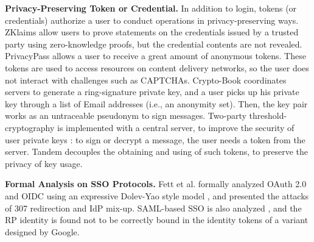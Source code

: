 \vspace{0.8mm}
\noindent\textbf{Privacy-Preserving Token or Credential.}
In addition to login,
    tokens (or credentials) authorize a user to conduct operations
        in privacy-preserving ways.
ZKlaims \cite{zklaim} allow users to prove statements on the credentials issued by a trusted party
    using zero-knowledge proofs,
        but the credential contents are not revealed.
PrivacyPass \cite{privacypass} allows a user to receive a great amount of anonymous tokens.
 These tokens are used to access resources on content delivery networks,
    so  the user does not interact with challenges such as CAPTCHAs.
Crypto-Book \cite{crypto-book} coordinates servers to generate a ring-signature private key,
 and a user picks up his private key through a list of Email addresses (i.e., an anonymity set).
 Then, the key pair works as an untraceable pseudonym to sign messages.
Two-party threshold-cryptography is implemented with a central server,
    to improve the security of user private keys \cite{mRSA,ss-rsa}:
    to sign or decrypt a message, the user needs a token from the server.
    Tandem \cite{tandem} decouples the obtaining and using of such tokens,
to preserve the privacy of key usage.

\vspace{0.8mm}
\noindent\textbf{Formal Analysis on SSO Protocols.}
Fett et al. \cite{FettKS16, FettKS17} formally analyzed OAuth 2.0 and OIDC using an expressive Dolev-Yao style model \cite{FettKS14},
    and presented the attacks of 307 redirection and IdP mix-up.
SAML-based SSO is also analyzed \cite{ArmandoCCCT08},
    and the RP identity is found not to be correctly bound in the identity tokens of a variant designed by Google.



